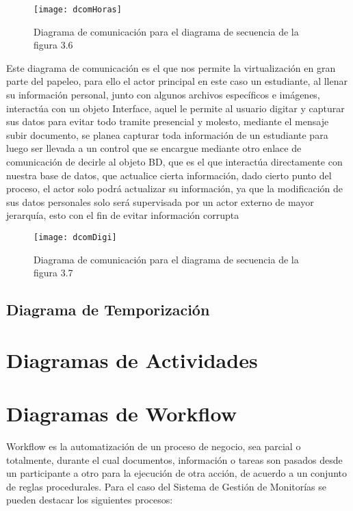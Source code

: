 \begin{figure}[H]
	\centering
	\texttt{[image: dcomHoras]}
    \centering
    \caption{Diagrama de comunicación para el diagrama de secuencia de la figura 3.6}
	\label{fig:dcomHoras}
\end{figure}
\clearpage
Este diagrama de comunicación es el que nos permite la virtualización en gran parte del papeleo, para ello el actor principal en este caso un estudiante, al llenar su información personal, junto con algunos archivos específicos e imágenes, interactúa con un objeto Interface, aquel le permite al usuario digitar y capturar sus datos para evitar todo tramite presencial y molesto, mediante el mensaje subir documento, se planea capturar toda información de un estudiante para luego ser llevada a un control que se encargue mediante otro enlace de comunicación de decirle al objeto BD, que es el que interactúa directamente con nuestra base de datos, que actualice cierta información, dado cierto punto del proceso, el actor solo podrá actualizar su información, ya que la modificación de sus datos personales solo será supervisada por un actor externo de mayor jerarquía, esto con el fin de evitar información corrupta
\begin{figure}[H]
	\centering
	\texttt{[image: dcomDigi]}
    \centering
    \caption{Diagrama de comunicación para el diagrama de secuencia de la figura 3.7}
	\label{fig:dcomDigi}
\end{figure}
\clearpage

\newpage

\subsection{Diagrama de Temporización}

\newpage

\section{Diagramas de Actividades}

\newpage

\section{Diagramas de Workflow}

Workflow es la automatización de un proceso de negocio, sea parcial o totalmente, durante el cual documentos, información o tareas son pasados desde un participante a otro para la ejecución de otra acción, de acuerdo a un conjunto de reglas procedurales. \cite{workflow} Para el caso del Sistema de Gestión de Monitorías se pueden destacar los siguientes procesos:

